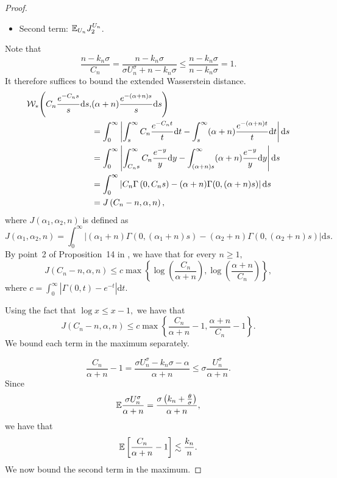 \begin{proof}
   
    \begin{itemize}
        \item Second term: $\mathbb{E}_{U_n} J_2^{U_n}$.
    \end{itemize}
    Note that 
    \[
    \frac{n-k_n\sigma}{C_n} = \frac{n-k_n\sigma}{ \sigma U_n^\sigma + n - k_n\sigma} \leq \frac{n-k_n\sigma}{n-k_n\sigma} = 1.
    \]
    It therefore suffices to bound the extended Wasserstein distance.
    \begin{align*}
    \mathcal{W}_*\Bigg( C_n\frac{e^{-C_ns}}{s}\mathrm{d}s, & (\alpha + n)\frac{e^{-(\alpha +n)s}}{s}\mathrm{d}s\Bigg) \\
    & = \int_0^\infty \left| \int_s^\infty C_n \frac{e^{-C_nt}}{t}\mathrm{d}t - \int_s^\infty (\alpha + n)\frac{e^{-(\alpha +n)t}}{t}\mathrm{d}t\right|\mathrm{d}s \\ 
    & = \int_0^\infty \left| \int_{C_ns}^\infty C_n \frac{e^{-y}}{y}\mathrm{d}y - \int_{(\alpha+n)s}^\infty (\alpha + n)\frac{e^{-y}}{y}\mathrm{d}y\right|\mathrm{d}s\\
    & = \int_0^\infty \left| C_n\Gamma\left(0,C_ns\right) - (\alpha + n)\Gamma(0, (\alpha + n)s) \right|\mathrm{d}s \\
    & = J\left(C_n-n,\alpha, n\right),
    \end{align*}
    where $J\left(\alpha_1, \alpha_2,n\right)$ is defined as
    \[
    J\left(\alpha_1, \alpha_2, n\right) = \int_0^\infty \left| (\alpha_1 + n)\Gamma(0,(\alpha_1 + n)s) - (\alpha_2+n)\Gamma(0,(\alpha_2 +n)s) \right|\mathrm{d}s.
    \] 
    By point~2 of Proposition~14 in \cite{catalano2026merging}, we have that for every $n \geq 1,$
    \[
    J\left(C_n - n, \alpha, n\right) \leq c \max\left\{ \log\left( \frac{C_n}{\alpha + n}\right), \log\left( \frac{\alpha + n}{C_n}\right)\right\},
    \]
    where $c  =\int_0^\infty \left| \Gamma(0, t) - e^{-t} \right|\mathrm{d}t.$

    Using the fact that $\log x \leq x - 1,$ we have that 
    \[
    J\left(C_n - n, \alpha, n\right) \leq c \max \left\{ \frac{C_n}{\alpha + n}-1, \frac{\alpha + n}{C_n} - 1\right\}.
    \]
    We bound each term in the maximum separately.

    \[
    \frac{C_n}{\alpha + n} - 1 = \frac{ \sigma U_n^\sigma - k_n \sigma - \alpha}{\alpha + n} \leq  \sigma \frac{U_n^\sigma}{\alpha + n}.
    \]
    Since
    \[
    \mathbb{E} \frac{ \sigma U_n^\sigma}{\alpha + n} = \frac{\sigma\left(k_n + \frac{\theta}{\sigma}\right)}{\alpha + n},
    \]
    we have that
    \[
    \mathbb{E} \left[ \frac{C_n}{\alpha + n} - 1\right] \lesssim \frac{k_n}{n}.
    \]
    We now bound the second term in the maximum.


\end{proof}
